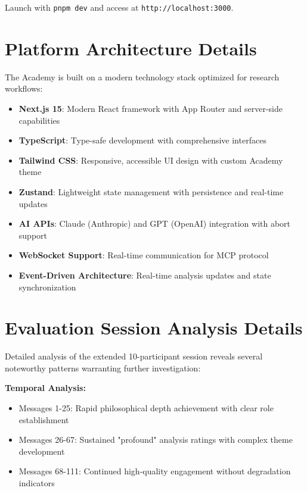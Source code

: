 \documentclass[11pt,letterpaper]{article}
\newcommand{\theacademy}{The Academy}
\begin{document}
Launch with \texttt{pnpm dev} and access at \texttt{http://localhost:3000}.

\section{Platform Architecture Details}
\label{app:architecture}

\theacademy{} is built on a modern technology stack optimized for research workflows:

\begin{itemize}
    \item \textbf{Next.js 15}: Modern React framework with App Router and server-side capabilities
    \item \textbf{TypeScript}: Type-safe development with comprehensive interfaces
    \item \textbf{Tailwind CSS}: Responsive, accessible UI design with custom Academy theme
    \item \textbf{Zustand}: Lightweight state management with persistence and real-time updates
    \item \textbf{AI APIs}: Claude (Anthropic) and GPT (OpenAI) integration with abort support
    \item \textbf{WebSocket Support}: Real-time communication for MCP protocol
    \item \textbf{Event-Driven Architecture}: Real-time analysis updates and state synchronization
\end{itemize}

\section{Evaluation Session Analysis Details}
\label{app:evaluation}

Detailed analysis of the extended 10-participant session reveals several noteworthy patterns warranting further investigation:

\textbf{Temporal Analysis:}
\begin{itemize}
    \item Messages 1-25: Rapid philosophical depth achievement with clear role establishment
    \item Messages 26-67: Sustained "profound" analysis ratings with complex theme development
    \item Messages 68-111: Continued high-quality engagement without degradation indicators
\end{itemize}
\end{document}
